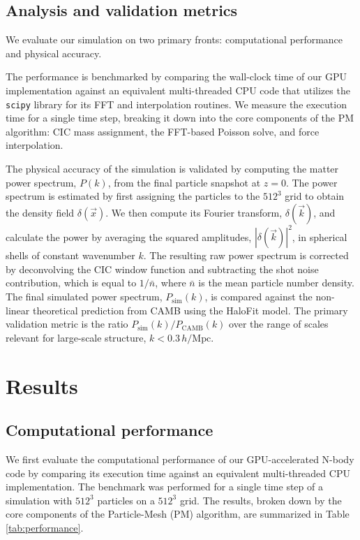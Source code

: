 \documentclass[]{article}
\begin{document}
\subsection{Analysis and validation metrics}

We evaluate our simulation on two primary fronts: computational performance and physical accuracy.

The performance is benchmarked by comparing the wall-clock time of our GPU implementation against an equivalent multi-threaded CPU code that utilizes the \texttt{scipy} library for its FFT and interpolation routines. We measure the execution time for a single time step, breaking it down into the core components of the PM algorithm: CIC mass assignment, the FFT-based Poisson solve, and force interpolation.

The physical accuracy of the simulation is validated by computing the matter power spectrum, $P(k)$, from the final particle snapshot at $z=0$. The power spectrum is estimated by first assigning the particles to the $512^3$ grid to obtain the density field $\delta(\vec{x})$. We then compute its Fourier transform, $\delta(\vec{k})$, and calculate the power by averaging the squared amplitudes, $|\delta(\vec{k})|^2$, in spherical shells of constant wavenumber $k$. The resulting raw power spectrum is corrected by deconvolving the CIC window function and subtracting the shot noise contribution, which is equal to $1/\bar{n}$, where $\bar{n}$ is the mean particle number density. The final simulated power spectrum, $P_{\text{sim}}(k)$, is compared against the non-linear theoretical prediction from CAMB using the HaloFit model. The primary validation metric is the ratio $P_{\text{sim}}(k) / P_{\text{CAMB}}(k)$ over the range of scales relevant for large-scale structure, $k < 0.3 \, h/\text{Mpc}$.

\section{Results}
\label{sec:results}
\subsection{Computational performance}

We first evaluate the computational performance of our GPU-accelerated N-body code by comparing its execution time against an equivalent multi-threaded CPU implementation. The benchmark was performed for a single time step of a simulation with $512^3$ particles on a $512^3$ grid. The results, broken down by the core components of the Particle-Mesh (PM) algorithm, are summarized in Table \ref{tab:performance}.
\end{document}
